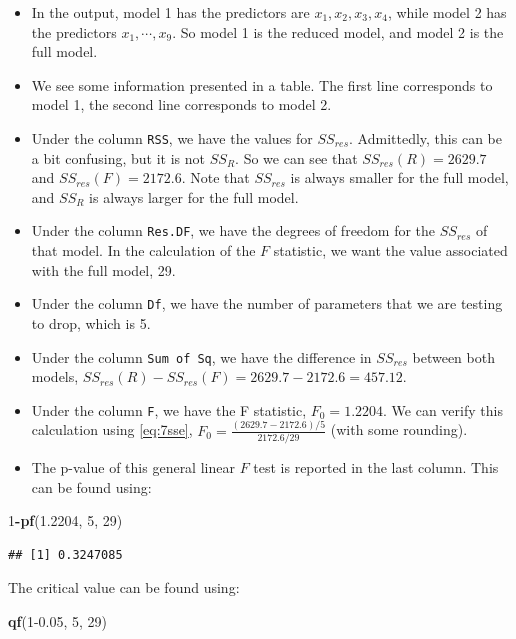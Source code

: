 \documentclass[
]{book}
\newenvironment{Shaded}{\begin{snugshade}}{\end{snugshade}}
\newcommand{\DecValTok}[1]{\textcolor[rgb]{0.00,0.00,0.81}{#1}}
\newcommand{\FloatTok}[1]{\textcolor[rgb]{0.00,0.00,0.81}{#1}}
\newcommand{\FunctionTok}[1]{\textcolor[rgb]{0.13,0.29,0.53}{\textbf{#1}}}
\newcommand{\NormalTok}[1]{#1}
\newcommand{\SpecialCharTok}[1]{\textcolor[rgb]{0.81,0.36,0.00}{\textbf{#1}}}
\begin{document}
\begin{itemize}
\item
  In the output, model 1 has the predictors are \(x_1, x_2, x_3, x_4\), while model 2 has the predictors \(x_1, \cdots, x_9\). So model 1 is the reduced model, and model 2 is the full model.
\item
  We see some information presented in a table. The first line corresponds to model 1, the second line corresponds to model 2.
\item
  Under the column \texttt{RSS}, we have the values for \(SS_{res}\). Admittedly, this can be a bit confusing, but it is not \(SS_R\). So we can see that \(SS_{res}(R) = 2629.7\) and \(SS_{res}(F) = 2172.6\). Note that \(SS_{res}\) is always smaller for the full model, and \(SS_R\) is always larger for the full model.
\item
  Under the column \texttt{Res.DF}, we have the degrees of freedom for the \(SS_{res}\) of that model. In the calculation of the \(F\) statistic, we want the value associated with the full model, 29.
\item
  Under the column \texttt{Df}, we have the number of parameters that we are testing to drop, which is 5.
\item
  Under the column \texttt{Sum\ of\ Sq}, we have the difference in \(SS_{res}\) between both models, \(SS_{res}(R) - SS_{res}(F) = 2629.7 - 2172.6 = 457.12\).
\item
  Under the column \texttt{F}, we have the F statistic, \(F_0 = 1.2204\). We can verify this calculation using \eqref{eq:7sse}, \(F_0 = \frac{(2629.7 - 2172.6)/5}{2172.6/29}\) (with some rounding).
\item
  The p-value of this general linear \(F\) test is reported in the last column. This can be found using:
\end{itemize}

\begin{Shaded}
\begin{Highlighting}[]
\DecValTok{1}\SpecialCharTok{{-}}\FunctionTok{pf}\NormalTok{(}\FloatTok{1.2204}\NormalTok{, }\DecValTok{5}\NormalTok{, }\DecValTok{29}\NormalTok{)}
\end{Highlighting}
\end{Shaded}

\begin{verbatim}
## [1] 0.3247085
\end{verbatim}

The critical value can be found using:

\begin{Shaded}
\begin{Highlighting}[]
\FunctionTok{qf}\NormalTok{(}\DecValTok{1}\FloatTok{{-}0.05}\NormalTok{, }\DecValTok{5}\NormalTok{, }\DecValTok{29}\NormalTok{)}
\end{Highlighting}
\end{Shaded}
\end{document}
